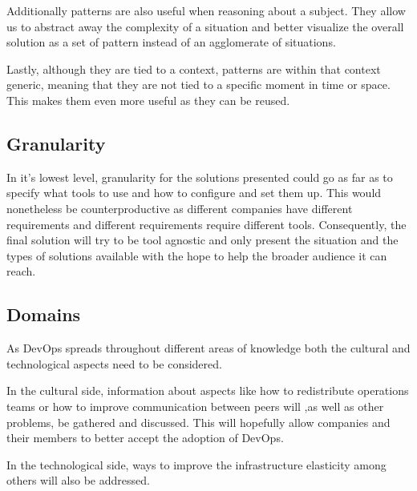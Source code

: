     		  Additionally patterns are also useful when reasoning about a subject. They allow us to abstract away the complexity of a situation and better visualize the overall solution as a set of pattern instead of an agglomerate of situations.
    
    		  Lastly, although they are tied to a context, patterns are within that context generic, meaning that they are not tied to a specific moment in time or space. This makes them even more useful as they can be reused.
    
    		\subsection{Granularity}
    		  In it's lowest level, granularity for the solutions presented could go as far as to specify what tools to use and how to configure and set them up. This would nonetheless be counterproductive as different companies have different requirements and different requirements require different tools. Consequently, the final solution will try to be tool agnostic and only present the situation and the types of solutions available with the hope to help the broader audience it can reach.

    		\subsection{Domains}
    
    		  As DevOps spreads throughout different areas of knowledge both the cultural and technological aspects need to be considered. 
    
    		  In the cultural side, information about aspects like how to redistribute operations teams or how to improve communication between peers will ,as well as other problems, be gathered and discussed. This will hopefully allow companies and their members to better accept the adoption of DevOps.
    
    		  In the technological side, ways to improve the infrastructure elasticity among others will also be addressed.  


